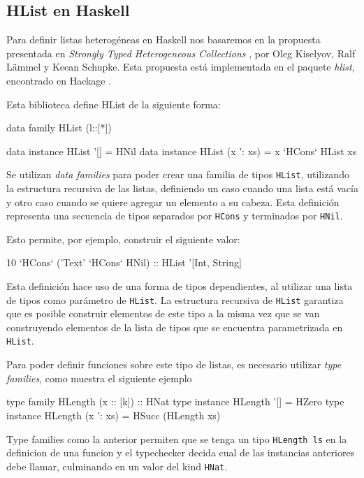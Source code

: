 \subsection{HList en Haskell}

Para definir listas heterogéneas en Haskell nos basaremos en la propuesta presentada en \textit{Strongly Typed Heterogeneous Collections} \cite{Kiselyov:2004:STH:1017472.1017488}, por Oleg Kiselyov, Ralf L\"{a}mmel y Keean Schupke. Esta propuesta está implementada en el paquete \textit{hlist}, encontrado en Hackage \cite{HListHackage}. 

Esta biblioteca define HList de la siguiente forma:

\begin{code}
data family HList (l::[*])

data instance HList '[] = HNil
data instance HList (x ': xs) = x `HCons` HList xs
\end{code}

Se utilizan \textit{data families} para poder crear una familia de tipos \texttt{HList}, utilizando la estructura recursiva de las listas, definiendo un caso cuando una lista está vacía y otro caso cuando se quiere agregar un elemento a su cabeza.
Esta definición representa una secuencia de tipos separados por \texttt{HCons} y terminados por \texttt{HNil}. 

Esto permite, por ejemplo, construir el siguiente valor:

\begin{code}
10 `HCons` ('Text' `HCons` HNil) :: HList '[Int, String]
\end{code}

Esta definición hace uso de una forma de tipos dependientes, al utilizar una lista de tipos como parámetro de \texttt{HList}. La estructura recursiva de \texttt{HList} garantiza que es posible construir elementos de este tipo a la misma vez que se van construyendo elementos de la lista de tipos que se encuentra parametrizada en \texttt{HList}.

Para poder definir funciones sobre este tipo de listas, es necesario utilizar \textit{type families}, como muestra el siguiente ejemplo

\begin{code}
type family HLength (x :: [k]) :: HNat
type instance HLength '[] = HZero
type instance HLength (x ': xs) = HSucc (HLength xs)
\end{code}

Type families como la anterior permiten que se tenga un tipo \texttt{HLength ls} en la definicion de una funcion y el typechecker decida cual de las instancias anteriores debe llamar, culminando en un valor del kind \texttt{HNat}.

